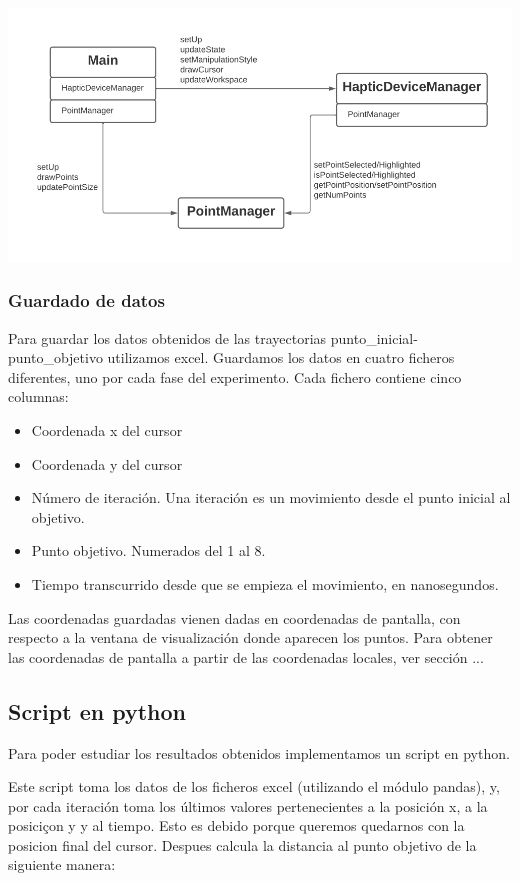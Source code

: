 \documentclass[a4paper,11pt, oneside]{book}
\begin{document}
\includegraphics[scale=0.4]{diagrama}

\subsubsection{Guardado de datos}

Para guardar los datos obtenidos de las trayectorias punto\_inicial-punto\_objetivo utilizamos excel. Guardamos los datos en cuatro ficheros diferentes, uno por cada fase del experimento. Cada fichero contiene cinco columnas:
\begin{itemize}
	\item Coordenada x del cursor
	\item Coordenada y del cursor
	\item Número de iteración. Una iteración es un movimiento desde el punto inicial al objetivo.
	\item Punto objetivo. Numerados del 1 al 8.
	\item Tiempo transcurrido desde que se empieza el movimiento, en nanosegundos.
\end{itemize}

Las coordenadas guardadas vienen dadas en coordenadas de pantalla, con respecto a la ventana de visualización donde aparecen los puntos. Para obtener las coordenadas de pantalla a partir de las coordenadas locales, ver sección ...


\subsection{Script en python}

Para poder estudiar los resultados obtenidos implementamos un script en python.

Este script toma los datos de los ficheros excel (utilizando el módulo pandas), y, por cada iteración toma los últimos valores pertenecientes a la posición x, a la posiciçon y y al tiempo. Esto es debido porque queremos quedarnos con la posicion final del cursor. Despues calcula la distancia al punto objetivo de la siguiente manera:
\end{document}
